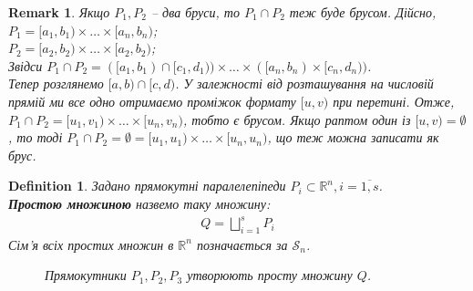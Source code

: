 \documentclass[a4paper, 10pt]{article}
\theoremstyle{theoremdd}
\theoremstyle{theoremdd}
\newtheorem{definition}[theorem]{Definition}
\theoremstyle{theoremdd}
\theoremstyle{theoremdd}
\theoremstyle{theoremdd}
\theoremstyle{theoremdd}
\theoremstyle{theoremdd}
\theoremstyle{theoremdd}
\theoremstyle{theoremdd}
\theoremstyle{theoremdd}
\theoremstyle{theoremdd}
\newtheorem{remark}[theorem]{Remark}
\theoremstyle{theoremdd}
\theoremstyle{theoremdd}
\theoremstyle{theoremdd}
\theoremstyle{theoremdd}
\begin{document}
\begin{remark}
Якщо $P_1,P_2$ -- два бруси, то $P_1 \cap P_2$ теж буде брусом. Дійсно,\\
$P_1 = [a_1,b_1) \times \dots \times [a_n,b_n)$;\\
$P_2 = [a_2,b_2) \times \dots \times [a_2,b_2)$;\\
Звідси $P_1 \cap P_2 = ([a_1,b_1) \cap [c_1,d_1)) \times \dots \times ([a_n,b_n) \times [c_n,d_n))$.\\
Тепер розглянемо $[a,b) \cap [c,d)$. У залежності від розташування на числовій прямій ми все одно отримаємо проміжок формату $[u,v)$ при перетині. Отже, $P_1 \cap P_2 = [u_1,v_1) \times \dots \times [u_n,v_n)$, тобто є брусом. Якщо раптом один із $[u,v) = \emptyset$, то тоді $P_1 \cap P_2 = \emptyset = [u_1,u_1) \times \dots \times [u_n,u_n)$, що теж можна записати як брус.
\end{remark}

\begin{definition}
Задано прямокутні паралелепіпеди $P_i \subset \mathbb{R}^n, i = \overline{1,s}$.\\
\textbf{Простою множиною} назвемо таку множину:
\begin{align*}
Q = \bigsqcup_{i=1}^s P_i
\end{align*}
Сім'я всіх простих множин в $\mathbb{R}^n$ позначається за $\mathcal{S}_n$.
\begin{figure}[H]
\centering
{}
\caption*{Прямокутники $P_1,P_2,P_3$ утворюють просту множину $Q$.}
\end{figure}
\end{definition}
\end{document}
